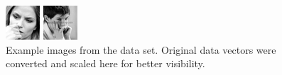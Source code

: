 \documentclass[11pt]{article}
\begin{document}
\begin{figure}[!htbp]
\begin{minipage}[b]{0.2\textwidth}
  \end{minipage}
    \hfill
    \begin{minipage}[b]{0.2\textwidth}
    \includegraphics[width=\textwidth]{face2}
  \end{minipage}
   \hfill
       \begin{minipage}[b]{0.2\textwidth}
    \includegraphics[width=\textwidth]{face3}
  \end{minipage}
   \caption{Example images from the data set. Original data vectors were converted and scaled here for better visibility.}
\end{figure}
	
\end{document}
